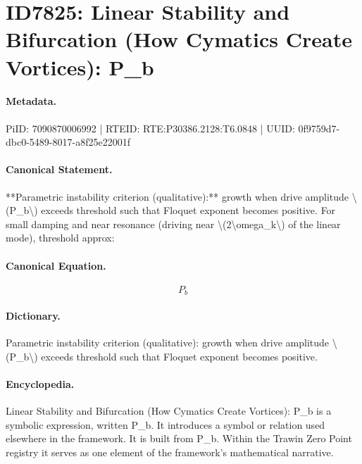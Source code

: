 \section*{ID7825: Linear Stability and Bifurcation (How Cymatics Create Vortices): P\_b}
\paragraph{Metadata.}
PiID: 7090870006992 | RTEID: RTE:P30386.2128:T6.0848 | UUID: 0f9759d7-dbc0-5489-8017-a8f25e22001f

\paragraph{Canonical Statement.}
**Parametric instability criterion (qualitative):** growth when drive amplitude \textbackslash{}(P\_b\textbackslash{}) exceeds threshold such that Floquet exponent becomes positive. For small damping and near resonance (driving near \textbackslash{}(2\textbackslash{}omega\_k\textbackslash{}) of the linear mode), threshold approx:

\paragraph{Canonical Equation.}
\[
P_b
\]

\paragraph{Dictionary.}
Parametric instability criterion (qualitative): growth when drive amplitude \textbackslash{}(P\_b\textbackslash{}) exceeds threshold such that Floquet exponent becomes positive.

\paragraph{Encyclopedia.}
Linear Stability and Bifurcation (How Cymatics Create Vortices): P\_b is a symbolic expression, written P\_b. It introduces a symbol or relation used elsewhere in the framework. It is built from P\_b. Within the Trawin Zero Point registry it serves as one element of the framework's mathematical narrative.
